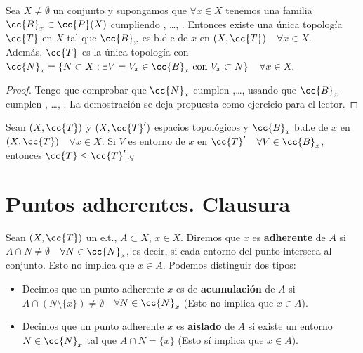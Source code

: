 \begin{prop}
    Sea $X \neq \emptyset$ un conjunto y supongamos que $\forall x \in X$ tenemos una familia $\cc{B}_x \subset \cc{P}(X)$ cumpliendo , \dots, . Entonces existe una única topología $\cc{T}$ en $X$ tal que $\cc{B}_x$ es b.d.e de $x$ en $(X,\cc{T})$\ \ $\forall x \in X$.\\

    Además, $\cc{T}$ es la única topología con $\cc{N}_x=\{N\subset X : \exists V=V_x \in \cc{B}_x\text{ con }V_x\subset N\}$\ \ $\forall x \in X$.

    \begin{proof}
        Tengo que comprobar que $\cc{N}_x$ cumplen ,\dots,  usando que $\cc{B}_x$ cumplen , \dots, . La demostración se deja propuesta como ejercicio para el lector. %
    \end{proof}
\end{prop}

\begin{ejercicio}
    Sean $(X, \cc{T})$ y $(X, \cc{T}')$ espacios topológicos y $\cc{B}_x$ b.d.e de $x$ en $(X,\cc{T})$\ \ $\forall x \in X$. Si $V$ es entorno de $x$ en $\cc{T}'$\ \ $\forall V \in \cc{B}_x$, entonces $\cc{T} \leq \cc{T}'$.ç
    \endsquare
\end{ejercicio}

\section{Puntos adherentes. Clausura}

\begin{definicion}
    Sean $(X, \cc{T})$ un e.t., $A\subset X$, $x\in X$. Diremos que $x$ es \textbf{adherente} de $A$ si $A\cap N\neq\emptyset$\ \ $\forall N \in \cc{N}_x$, es decir, si cada entorno del punto interseca al conjunto. Esto no implica que $x\in A$. Podemos distinguir dos tipos:
    \begin{itemize}
        \item Decimos que un punto adherente $x$ es de \textbf{acumulación} de $A$ si $A\cap(N\setminus\{x\})\neq \emptyset$\ \ $\forall N \in \cc{N}_x$ (Esto no implica que $x\in A$).
        \item Decimos que un punto adherente $x$ es \textbf{aislado} de $A$ si existe un entorno $N\in \cc{N}_x$ tal que $A\cap N=\{x\}$ (Esto sí implica que $x\in A$).
    \end{itemize}
\end{definicion}